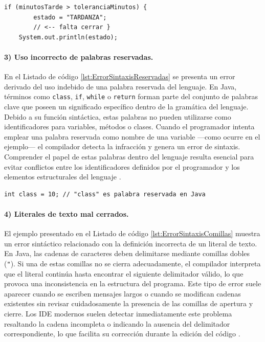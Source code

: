 \documentclass[12pt,twoside]{book}
\begin{document}
						\begin{lstlisting}[style=Java,caption={Error de sintaxis: llaves desbalanceadas.}, label={lst:ErrorSintaxisLlaves}]
	if (minutosTarde > toleranciaMinutos) {
		estado = "TARDANZA";
		// <-- falta cerrar }
	System.out.println(estado); \end{lstlisting}
						
						\paragraph{3) Uso incorrecto de palabras reservadas.} En el Listado de código \ref{lst:ErrorSintaxisReservadas} se presenta un error derivado del uso indebido de una palabra reservada del lenguaje. En Java, términos como \texttt{class}, \texttt{if}, \texttt{while} o \texttt{return} forman parte del conjunto de palabras clave que poseen un significado específico dentro de la gramática del lenguaje. Debido a su función sintáctica, estas palabras no pueden utilizarse como identificadores para variables, métodos o clases. Cuando el programador intenta emplear una palabra reservada como nombre de una variable —como ocurre en el ejemplo— el compilador detecta la infracción y genera un error de sintaxis. Comprender el papel de estas palabras dentro del lenguaje resulta esencial para evitar conflictos entre los identificadores definidos por el programador y los elementos estructurales del lenguaje \cite{Deitel2025Java,Sebesta2018Concepts}.
						
						\begin{lstlisting}[style=Java,caption={Error de sintaxis: palabra reservada mal utilizada.},label={lst:ErrorSintaxisReservadas}]
	int class = 10; // "class" es palabra reservada en Java \end{lstlisting}
						
						\paragraph{4) Literales de texto mal cerrados.} El ejemplo presentado en el Listado de código \ref{lst:ErrorSintaxisComillas} muestra un error sintáctico relacionado con la definición incorrecta de un literal de texto. En Java, las cadenas de caracteres deben delimitarse mediante comillas dobles (\texttt{"}). Si una de estas comillas no se cierra adecuadamente, el compilador interpreta que el literal continúa hasta encontrar el siguiente delimitador válido, lo que provoca una inconsistencia en la estructura del programa. Este tipo de error suele aparecer cuando se escriben mensajes largos o cuando se modifican cadenas existentes sin revisar cuidadosamente la presencia de las comillas de apertura y cierre. Los IDE modernos suelen detectar inmediatamente este problema resaltando la cadena incompleta o indicando la ausencia del delimitador correspondiente, lo que facilita su corrección durante la edición del código \cite{Gaddis2022Starting,Farrell2018Programming}.
						
\end{document}
